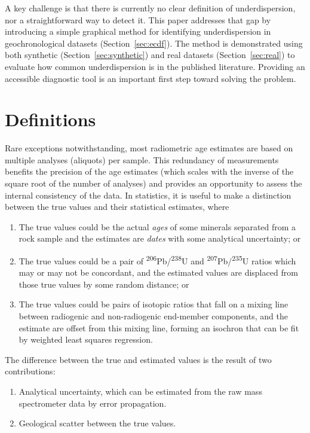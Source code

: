 \documentclass{article}
\begin{document}
A key challenge is that there is currently no clear definition of
underdispersion, nor a straightforward way to detect it. This paper
addresses that gap by introducing a simple graphical method for
identifying underdispersion in geochronological datasets
(Section~\ref{sec:ecdf}). The method is demonstrated using both
synthetic (Section~\ref{sec:synthetic}) and real datasets
(Section~\ref{sec:real}) to evaluate how common underdispersion is in
the published literature. Providing an accessible diagnostic tool is
an important first step toward solving the problem.

\section{Definitions}\label{sec:definitions}

Rare exceptions notwithstanding, most radiometric age estimates are
based on multiple analyses (aliquots) per sample.  This redundancy
of measurements benefits the precision of the age estimates (which
scales with the inverse of the square root of the number of analyses)
and provides an opportunity to assess the internal consistency of the
data. In statistics, it is useful to make a distinction between the
true values and their statistical estimates, where

\begin{enumerate}
\item The true values could be the actual \emph{ages} of some minerals
  separated from a rock sample and the estimates are \emph{dates} with
  some analytical uncertainty; or
\item The true values could be a pair of
  \textsuperscript{206}Pb/\textsuperscript{238}U and
  \textsuperscript{207}Pb/\textsuperscript{235}U ratios which may or
  may not be concordant, and the estimated values are displaced from
  those true values by some random distance; or
\item The true values could be pairs of isotopic ratios that fall on a
  mixing line between radiogenic and non-radiogenic end-member
  components, and the estimate are offset from this mixing line,
  forming an isochron that can be fit by weighted least squares
  regression.
\end{enumerate}

The difference between the true and estimated values is the result of
two contributions:

\begin{enumerate}
\item Analytical uncertainty, which can be estimated from the raw mass
  spectrometer data by error propagation.
\item Geological scatter between the true values.
\end{enumerate}
\end{document}
